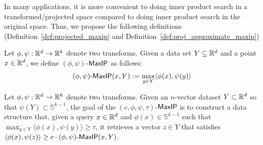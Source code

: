 In many applications, it is more convenient to doing inner product search in a transformed/projected space compared to doing inner product search in the original space. Thus, we propose the following definitions (Definition~\ref{def:projected_maxip} and Definition~\ref{def:proj_approximate_maxip})
\begin{definition}\label{def:projected_maxip} 
Let $\phi, \psi: \mathbb{R}^d \rightarrow \mathbb{R}^k$ denote two transforms. Given a data set $Y\subseteq \mathbb{R}^d$ and a point $x\in\mathbb{R}^d$, we define $(\phi, \psi)$-$\mathsf{MaxIP}$ as follows:
\begin{align*}
    (\phi, \psi)\text{-}\mathsf{MaxIP} (x,Y) := \max_{y \in Y} \langle \phi(x),\psi(y) \rangle
\end{align*}
\end{definition}


\begin{definition}\label{def:proj_approximate_maxip}
Let $\phi, \psi: \mathbb{R}^d \rightarrow \mathbb{R}^k$ denote two transforms. Given an $n$-vector dataset $Y \subset \mathbb{R}^d $ so that $\psi(Y) \subset \mathbb{S}^{k-1}$, the goal of the $(c,\phi, \psi,\tau)$-{$\mathsf{MaxIP}$} is to construct a data structure that, given a query $x\in \mathbb{R}^d$ and $\phi(x) \in \mathbb{S}^{k-1}$ such that $\max_{y\in Y}\langle \phi(x) , \psi(y) \rangle \geq \tau$, it retrieves a vector $z \in Y$ that satisfies $\langle \phi(x) , \psi(z) \rangle \geq c \cdot (\phi, \psi)\text{-}\mathsf{MaxIP} (x,Y)$.
\end{definition}

